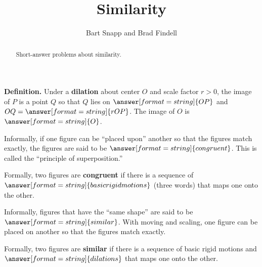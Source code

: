 \documentclass[nooutcomes]{ximera}
\title{Similarity}
\author{Bart Snapp and Brad Findell}
\begin{document}
\begin{abstract}
Short-answer problems about similarity. 
\end{abstract}
\maketitle




%
%
%
%

\begin{question}
\textbf{Definition.} Under a \textbf{dilation} about center $O$ and scale factor $r>0$, the image of $P$ is 
a point $Q$ so that $Q$ lies on  
$\answer[format=string]{OP}$ %
and $OQ=\answer[format=string]{rOP}$.  The image of $O$ is $\answer[format=string]{O}$. 
\end{question}


\begin{question}
Informally, if one figure can be ``placed upon'' another so that the figures match exactly, the figures are said to be $\answer[format=string]{congruent}$.  This is called the ``principle of superposition.''  
\begin{question}
Formally, two figures are \textbf{congruent} if there is a sequence of $\answer[format=string]{basic rigid motions}$ (three words) that maps one onto the other.  
\end{question}
\end{question}

\begin{question}
Informally, figures that have the ``same shape'' are said to be $\answer[format=string]{similar}$.  With moving and scaling, one figure can be placed on another so that the figures match exactly.    
\begin{question}
Formally, two figures are \textbf{similar} if there is a sequence of basic rigid motions and $\answer[format=string]{dilations}$ that maps one onto the other.  
\end{question}
\end{question}
\end{document}
